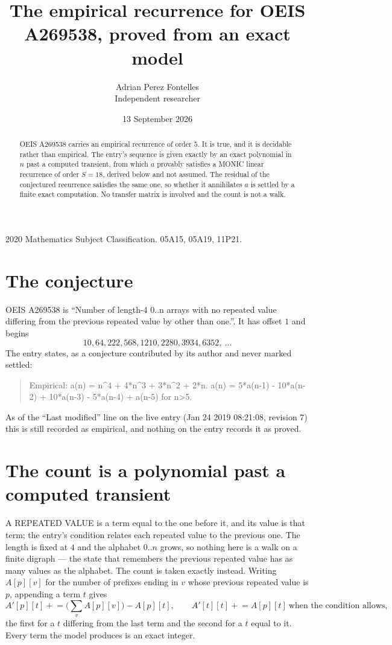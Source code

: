 \documentclass[11pt,a4paper]{article}
\title{The empirical recurrence for OEIS A269538, proved from an exact model}
\author{Adrian Perez Fontelles\\ \small Independent researcher}
\date{13 September 2026}
\theoremstyle{plain}
\theoremstyle{definition}
\begin{document}
\maketitle

\begin{abstract}
OEIS A269538 carries an empirical recurrence of order $5$. It is true, and it is
decidable rather than empirical. The entry's sequence is given exactly by an exact polynomial in $n$ past a computed transient, from
which $a$ provably satisfies a MONIC linear recurrence of order $S=18$, derived below and not
assumed. The residual of the conjectured recurrence satisfies the same one, so whether it
annihilates $a$ is settled by a finite exact computation. No transfer matrix is involved and
the count is not a walk.
\end{abstract}

\noindent\small 2020 Mathematics Subject Classification. 05A15, 05A19, 11P21.\normalsize

\section{The conjecture}

OEIS A269538 is ``Number of length-4 0..n arrays with no repeated value differing from the previous repeated value by other than one.''. It has offset $1$ and begins
\[
10, 64, 222, 568, 1210, 2280, 3934, 6352,\ \dots
\]
The entry states, as a conjecture contributed by its author and never marked settled:
\begin{quote}
Empirical: a(n) = n\^{}4 + 4*n\^{}3 + 3*n\^{}2 + 2*n. a(n) = 5*a(n-1) - 10*a(n-2) + 10*a(n-3) - 5*a(n-4) + a(n-5) for n>5.
\end{quote}
As of the ``Last modified'' line on the live entry (Jan 24 2019 08:21:08, revision 7)
this is still recorded as empirical, and nothing on the entry records it as proved.

\section{The count is a polynomial past a computed transient}

A REPEATED VALUE is a term equal to the one before it, and its value is that term; the entry's
condition relates each repeated value to the previous one. The length is fixed at $4$ and the
alphabet $0..n$ grows, so nothing here is a walk on a finite digraph --- the state that
remembers the previous repeated value has as many values as the alphabet. The count is taken
exactly instead. Writing $A[p][v]$ for the number of prefixes ending in $v$ whose previous
repeated value is $p$, appending a term $t$ gives
\[
A'[p][t] \mathrel{+}= \Big(\sum_v A[p][v]\Big) - A[p][t],
\qquad
A'[t][t] \mathrel{+}= A[p][t]\ \text{when the condition allows},
\]
the first for a $t$ differing from the last term and the second for a $t$ equal to it. Every
term the model produces is an exact integer.
\end{document}
